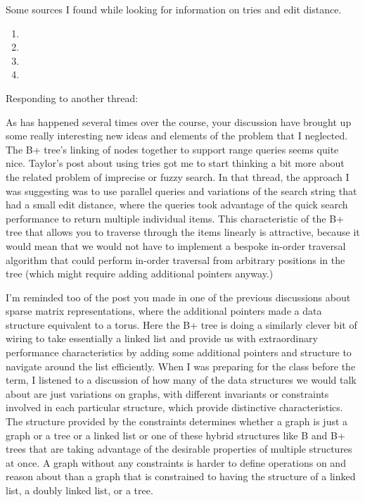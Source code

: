 \documentclass[10pt,letterpaper,final]{report}
\begin{document}
Some sources I found while looking for information on tries and edit distance.

\begin{enumerate}
  \item {}
  \item {}
  \item {}
  \item {}
\end{enumerate}

\pagebreak

Responding to another thread:

As has happened several times over the course, your discussion have brought up some really interesting new ideas and elements of the problem that I neglected. The B+ tree's linking of nodes together to support range queries seems quite nice. Taylor's post about using tries got me to start thinking a bit more about the related problem of imprecise or fuzzy search. In that thread, the approach I was suggesting was to use parallel queries and variations of the search string that had a small edit distance, where the queries took advantage of the quick search performance to return multiple individual items. This characteristic of the B+ tree that allows you to traverse through the items linearly is attractive, because it would mean that we would not have to implement a bespoke in-order traversal algorithm that could perform in-order traversal from arbitrary positions in the tree (which might require adding additional pointers anyway.)

I'm reminded too of the post you made in one of the previous discussions about sparse matrix representations, where the additional pointers made a data structure equivalent to a torus. Here the B+ tree is doing a similarly clever bit of wiring to take essentially a linked list and provide us with extraordinary performance characteristics by adding some additional pointers and structure to navigate around the list efficiently. When I was preparing for the class before the term, I listened to a discussion of how many of the data structures we would talk about are just variations on graphs, with different invariants or constraints involved in each particular structure, which provide distinctive characteristics. The structure provided by the constraints determines whether a graph is just a graph or a tree or a linked list or one of these hybrid structures like B and B+ trees that are taking advantage of the desirable properties of multiple structures at once. A graph without any constraints is harder to define operations on and reason about than a graph that is constrained to having the structure of a linked list, a doubly linked list, or a tree.
\end{document}
